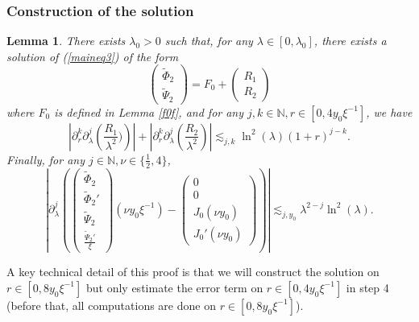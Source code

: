 \documentclass[11 pt]{amsart}
\newtheorem{lem}{Lemma}[section]
\theoremstyle{definition}
\theoremstyle{remark}
\numberwithin{equation}{section}
\begin{document}
\subsubsection{Construction of the solution}

\begin{lem}
  \label{aghanim}There exists $\lambda_0 > 0$ such that, for any $\lambda \in
  [0, \lambda_0]$, there exists a solution of (\ref{maineq3}) of the form
  \[ \left(\begin{array}{c}
       \widetilde{\Phi}_2\\
       \widetilde{\Psi}_2
     \end{array}\right) = F_0 + \left(\begin{array}{c}
       R_1\\
       R_2
     \end{array}\right) \]
  where $F_0$ is defined in Lemma \ref{f0f}, and for any $j, k \in \mathbb{N},
  r \in [0, 4 y_0 \xi^{- 1}]$, we have
  \[ \left| \partial_r^k \partial_{\lambda}^j \left(\frac{R_1}{\lambda^2}) \right) \right| + \left| \partial_r^k
     \partial_{\lambda}^j \left( \frac{R_2}{\lambda^2} \right) \right| \lesssim_{j, k}  \ln^2(\lambda) (1+r)^{j-k} . \]
  Finally, for any $j \in \mathbb{N}, \nu \in \{ \frac12, 4 \}$,
  \[ \left| \partial_{\lambda}^j \left( \left(\begin{array}{c}
       \widetilde{\Phi}_2\\
       \widetilde{\Phi}_2'\\
       \widetilde{\Psi}_2\\
       \frac{\widetilde{\Psi}_2'}{\xi}
     \end{array}\right) (\nu y_0 \xi^{- 1}) - \left(\begin{array}{c}
       0\\
       0\\
       J_0 (\nu y_0)\\
       J_0' (\nu y_0)
     \end{array}\right) \right) \right| \lesssim_{j,y_0} \lambda^{2 - j} \ln^2
     (\lambda) . \]
\end{lem}

A key technical detail of this proof is that we will construct the solution on
$r \in [0, 8 y_0 \xi^{- 1}]$ but only estimate the error term on $r \in [0, 4 y_0
\xi^{- 1}]$ in step 4 (before that, all computations are done on $r \in [0, 8 y_0
\xi^{- 1}]$).
\end{document}
